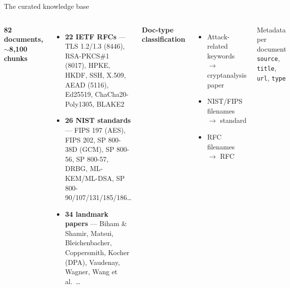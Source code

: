 \documentclass[aspectratio=169]{beamer}
\begin{document}
\begin{frame}{The curated knowledge base}
  \begin{columns}[t, totalwidth=\linewidth]
      \textbf{82 documents, $\sim$8,100 chunks}\\[2pt]
      \begin{itemize}
        \item \textbf{22 IETF RFCs} --- TLS 1.2/1.3 (8446), RSA-PKCS\#1
          (8017), HPKE, HKDF, SSH, X.509, AEAD (5116), Ed25519,
          ChaCha20-Poly1305, BLAKE2\\[1pt]
        \item \textbf{26 NIST standards} --- FIPS 197 (AES), FIPS 202,
          SP 800-38D (GCM), SP 800-56, SP 800-57, DRBG, ML-KEM/ML-DSA,
          SP 800-90/107/131/185/186\dots\\[1pt]
        \item \textbf{34 landmark papers} --- Biham \& Shamir,
          Matsui, Bleichenbacher, Coppersmith, Kocher (DPA), Vaudenay,
          Wagner, Wang et al.\ \dots
      \end{itemize}
      \textbf{Doc-type classification}\\[2pt]
      \begin{itemize}
        \item Attack-related keywords $\rightarrow$ cryptanalysis paper
        \item NIST/FIPS filenames $\rightarrow$ standard
        \item RFC filenames $\rightarrow$ RFC
      \end{itemize}
      \vspace{2mm}
      \begin{block}{\scriptsize Metadata per document}
        \scriptsize \texttt{source}, \texttt{title}, \texttt{url},
        \texttt{type}
      \end{block}
  \end{columns}
\end{frame}
\end{document}
